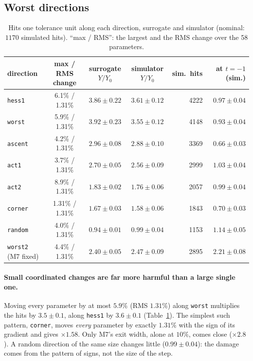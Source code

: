 \documentclass[11pt,a4paper]{article}
\newcommand{\HH}{Y/Y_0}
\begin{document}
\subsection{Worst directions}
\label{sec:walks}

\begin{table}[t]
\centering
\caption{Hits one tolerance unit along each direction, surrogate and simulator (nominal: $1170$
simulated hits). ``max / RMS'': the largest and the RMS change over the 58 parameters.}
\label{tab:walks}
\small
\begin{tabular}{lcccrr}
\toprule
direction & max / RMS change & surrogate $\HH$ & simulator $\HH$ & sim.\ hits & at $t=-1$ (sim.) \\
\midrule
\texttt{hess1}  & 6.1\% / 1.31\% & $3.86\pm0.22$ & $3.61\pm0.12$ & 4222 & $0.97\pm0.04$ \\
\texttt{worst}  & 5.9\% / 1.31\% & $3.92\pm0.23$ & $3.55\pm0.12$ & 4148 & $0.93\pm0.04$ \\
\texttt{ascent} & 4.2\% / 1.31\% & $2.96\pm0.08$ & $2.88\pm0.10$ & 3369 & $0.66\pm0.03$ \\
\texttt{act1}   & 3.7\% / 1.31\% & $2.70\pm0.05$ & $2.56\pm0.09$ & 2999 & $1.03\pm0.04$ \\
\texttt{act2}   & 8.9\% / 1.31\% & $1.83\pm0.02$ & $1.76\pm0.06$ & 2057 & $0.99\pm0.04$ \\
\texttt{corner} & 1.31\% / 1.31\% & $1.67\pm0.03$ & $1.58\pm0.06$ & 1843 & $0.70\pm0.03$ \\
\texttt{random} & 4.0\% / 1.31\% & $0.94\pm0.01$ & $0.99\pm0.04$ & 1153 & $1.14\pm0.05$ \\
\midrule
\texttt{worst2} (M7 fixed) & 4.4\% / 1.31\% & $2.40\pm0.05$ & $2.47\pm0.09$ & 2895 & $2.21\pm0.08$ \\
\bottomrule
\end{tabular}
\end{table}

\paragraph{Small coordinated changes are far more harmful than a large single one.}
Moving every parameter by at most $5.9\%$ (RMS $1.31\%$) along \texttt{worst} multiplies the hits
by $3.5\pm0.1$, along \texttt{hess1} by $3.6\pm0.1$ (Table~\ref{tab:walks}). The simplest such
pattern, \texttt{corner}, moves \emph{every} parameter by exactly $1.31\%$ with the sign of its
gradient and gives $\times1.58$. Only M7's exit width, alone at $10\%$, comes close
($\times2.8$). A random direction of the same size changes little ($0.99\pm0.04$): the damage
comes from the pattern of signs, not the size of the step.
\end{document}
